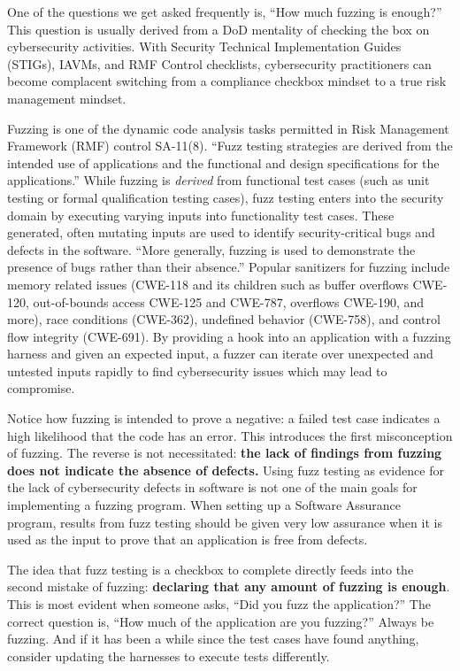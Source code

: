 One of the questions we get asked frequently is, ``How much fuzzing is enough?'' This question is usually derived from a DoD mentality of checking the box on cybersecurity activities. With Security Technical Implementation Guides (STIGs), IAVMs, and RMF Control checklists, cybersecurity practitioners can become complacent switching from a compliance checkbox mindset to a true risk management mindset.

Fuzzing is one of the dynamic code analysis tasks permitted in Risk Management Framework (RMF) control SA-11(8). ``Fuzz testing strategies are derived from the intended use of applications and the functional and design specifications for the applications.''\autocite[\pno~279]{20241118:nist80053rev5} While fuzzing is \textit{derived} from functional test cases (such as unit testing or formal qualification testing cases), fuzz testing enters into the security domain by executing varying inputs into functionality test cases. These generated, often mutating inputs are used to identify security-critical bugs and defects in the software. ``More generally, fuzzing is used to demonstrate the presence of bugs rather than their absence.''\autocite{20241118:wikifuzzing} Popular sanitizers for fuzzing include memory related issues (CWE-118 and its children such as buffer overflows {CWE-120}, out-of-bounds access {CWE-125 and CWE-787}, overflows {CWE-190}, and more), race conditions (CWE-362), undefined behavior (CWE-758), and control flow integrity (CWE-691). By providing a hook into an application with a fuzzing harness and given an expected input, a fuzzer can iterate over unexpected and untested inputs rapidly to find cybersecurity issues which may lead to compromise.

Notice how fuzzing is intended to prove a negative: a failed test case indicates a high likelihood that the code has an error. This introduces the first misconception of fuzzing. The reverse is not necessitated: \textbf{the lack of findings from fuzzing does not indicate the absence of defects.} Using fuzz testing as evidence for the lack of cybersecurity defects in software is not one of the main goals for implementing a fuzzing program. When setting up a Software Assurance program, results from fuzz testing should be given very low assurance when it is used as the input to prove that an application is free from defects.

The idea that fuzz testing is a checkbox to complete directly feeds into the second mistake of fuzzing: \textbf{declaring that any amount of fuzzing is enough}. This is most evident when someone asks, ``Did you fuzz the application?'' The correct question is, ``How much of the application are you fuzzing?'' Always be fuzzing. And if it has been a while since the test cases have found anything, consider updating the harnesses to execute tests differently.

